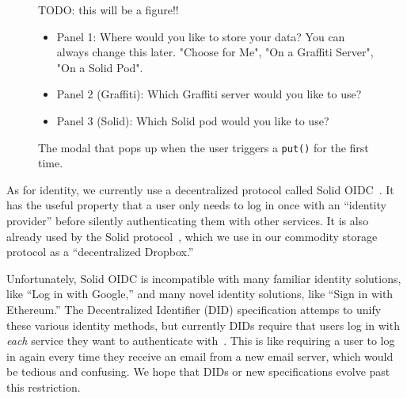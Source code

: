 
\begin{figure}
    \label{above-and-below:choose-protocol}
    TODO: this will be a figure!!
    \begin{itemize}
    \item
    Panel 1: Where would you like to store your data? You can always change this later.
    "Choose for Me", "On a Graffiti Server", "On a Solid Pod".
    \item
    Panel 2 (Graffiti): Which Graffiti server would you like to use?
    \item
    Panel 3 (Solid): Which Solid pod would you like to use?
    \end{itemize}
    \caption{The modal that pops up when the user triggers a \texttt{put()} for the first time.}
\end{figure}

As for identity, we currently use a decentralized protocol called Solid OIDC~\cite{solidoidc}.
It has the useful property that a user only needs to log in once
with an ``identity provider'' before silently authenticating
them with other services.
It is also already used by the Solid protocol~\cite{solid},
which we use in our commodity storage protocol as a ``decentralized Dropbox.''

Unfortunately, Solid OIDC is incompatible with many familiar
identity solutions, like ``Log in with Google,''
and many novel identity solutions, like ``Sign in with Ethereum.''
The Decentralized Identifier (DID) specification attemps to unify
these various identity methods, but currently DIDs require that
users log in with \emph{each} service they want to authenticate with~\cite{dids}.
This is like requiring a user to log in again every time
they receive an email from a new email server, which would
be tedious and confusing.
We hope that DIDs or new specifications evolve past this restriction.







